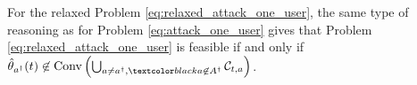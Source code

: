 For the relaxed Problem \eqref{eq:relaxed_attack_one_user}, the same type of reasoning as for Problem \eqref{eq:attack_one_user} gives that Problem \eqref{eq:relaxed_attack_one_user} is feasible if and only if $     \hat{\theta}_{a^{\dagger}}(t)\not\in \text{Conv}\left( \bigcup_{a\neq a^{\dagger}, \changee{a\not\in A^{\dagger}}} \mathcal{C}_{t,a}\right)$. 

